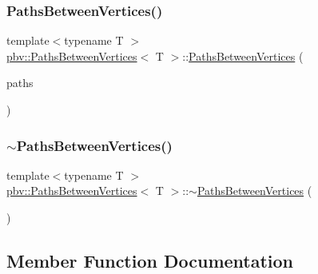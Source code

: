 \subsubsection{\texorpdfstring{Paths\+Between\+Vertices()}{PathsBetweenVertices()}\hspace{0.1cm}{\footnotesize\ttfamily [4/4]}}
{\footnotesize\ttfamily template$<$typename T $>$ \\
\mbox{\hyperlink{structpbv_1_1_paths_between_vertices}{pbv\+::\+Paths\+Between\+Vertices}}$<$ T $>$\+::\mbox{\hyperlink{structpbv_1_1_paths_between_vertices}{Paths\+Between\+Vertices}} (\begin{DoxyParamCaption}\item[{\mbox{\hyperlink{structpbv_1_1_paths_between_vertices}{Paths\+Between\+Vertices}}$<$ T $>$ \&\&}]{paths }\end{DoxyParamCaption})\hspace{0.3cm}{\ttfamily [noexcept]}}

\mbox{\label{structpbv_1_1_paths_between_vertices_a6be9fce23ff701beaf2a44006bd19e5b}} 
\subsubsection{\texorpdfstring{$\sim$\+Paths\+Between\+Vertices()}{~PathsBetweenVertices()}}
{\footnotesize\ttfamily template$<$typename T $>$ \\
\mbox{\hyperlink{structpbv_1_1_paths_between_vertices}{pbv\+::\+Paths\+Between\+Vertices}}$<$ T $>$\+::$\sim$\mbox{\hyperlink{structpbv_1_1_paths_between_vertices}{Paths\+Between\+Vertices}} (\begin{DoxyParamCaption}{ }\end{DoxyParamCaption})}



\subsection{Member Function Documentation}
\mbox{\label{structpbv_1_1_paths_between_vertices_aca6583521b4e35eec9db20c901f200e6}} 
